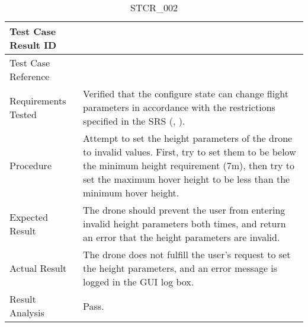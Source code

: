 \documentclass[12pt, titlepage]{article}
\begin{document}
\begin{table}[!h]
\begin{center}
\caption {STCR\_002}
\label{tab:STCR_002}
\begin{tabular}{ | m{3.2cm} | m{12.2cm} | } 
\hline
Test Case Result ID & \nameref{tab:STCR_002} \\ 
\hline
Test Case Reference & \nameref{tab:STC_002}  \\ 
\hline
Requirements Tested & Verified that the configure state can change flight parameters in accordance with the restrictions specified in the SRS (\nameref{SAFE_002}, \nameref{GEN_004}). \\ 
\hline
Procedure & Attempt to set the height parameters of the drone to invalid values. First, try to set them to be below the minimum height requirement (7m), then try to set the maximum hover height to be less than the minimum hover height.  \\ 
\hline
Expected Result & The drone should prevent the user from entering invalid height parameters both times, and return an error that the height parameters are invalid.   \\ 
\hline
Actual Result & The drone does not fulfill the user's request to set the height parameters, and an error message is logged in the GUI log box.  \\ 
\hline
Result Analysis & Pass.  \\ 
\hline
\end{tabular}
\end{center}
\end{table}
\end{document}
